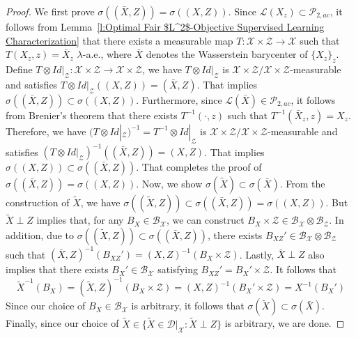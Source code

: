 \documentclass[twoside,11pt]{article}
\begin{document}
\begin{proof}
We first prove $\sigma((\bar{X},Z)) = \sigma((X,Z))$. Since $\mathcal{L}(X_z) \subset \mathcal{P}_{2,ac}$, it follows from Lemma~\ref{l:Optimal Fair $L^2$-Objective Supervised Learning Characterization} that there exists a measurable map $T: \mathcal{X} \times \mathcal{Z} \rightarrow \mathcal{X}$ such that $T(X_z,z) = \bar{X}_z$ $\lambda$-a.e., where $\bar{X}$ denotes the Wasserstein barycenter of $\{X_z\}_z$. Define $T \otimes Id|_{\mathcal{Z}} : \mathcal{X} \times \mathcal{Z} \rightarrow \mathcal{X} \times \mathcal{Z}$, we have $T \otimes Id|_{\mathcal{Z}}$ is $\mathcal{X} \times \mathcal{Z}/\mathcal{X} \times \mathcal{Z}$-measurable and satisfies $T \otimes Id|_{\mathcal{Z}}((X,Z)) = (\bar{X},Z)$. That implies $\sigma((\bar{X},Z)) \subset \sigma((X,Z))$. Furthermore, since $\mathcal{L}(\bar{X}) \in \mathcal{P}_{2,ac}$, it follows from Brenier's theorem \cite{brenier1991polar} that there exists $T^{-1}(\cdot,z)$ such that $T^{-1}(\bar{X}_z,z) = X_z$. Therefore, we have $(T \otimes Id|_{\mathcal{Z}})^{-1} = T^{-1} \otimes Id|_{\mathcal{Z}}$ is $\mathcal{X} \times \mathcal{Z}/\mathcal{X} \times \mathcal{Z}$-measurable and satisfies $(T \otimes Id|_{\mathcal{Z}})^{-1}((\bar{X},Z)) = (X,Z)$.  That implies $\sigma((X,Z))  \subset \sigma((\bar{X},Z))$. That completes the proof of $\sigma((\bar{X},Z)) = \sigma((X,Z))$.
Now, we show $\sigma(\tilde{X}) \subset \sigma(\bar{X})$. From the construction of $\tilde{X}$, we have $\sigma((\tilde{X},Z)) \subset \sigma((\bar{X},Z)) = \sigma((X,Z))$.  But $\tilde{X} \perp Z$ implies that, for any $B_X \in \mathcal{B}_{\mathcal{X}}$, we can construct $B_X \times \mathcal{Z} \in \mathcal{B}_{\mathcal{X}} \otimes \mathcal{B}_{\mathcal{Z}}$. In addition, due to $\sigma((\tilde{X},Z)) \subset \sigma((\bar{X},Z))$, there exists $B_{XZ}' \in \mathcal{B}_{\mathcal{X}} \otimes \mathcal{B}_{\mathcal{Z}}$ such that $(\bar{X},Z)^{-1}(B_{XZ}') = (X,Z)^{-1}(B_X \times \mathcal{Z})$. Lastly, $\bar{X} \perp Z$ also implies that there exists $B_X' \in \mathcal{B}_{\mathcal{X}}$ satisfying $B_{XZ}' = B_X' \times \mathcal{Z}$. It follows that
\begin{equation}
\tilde{X}^{-1}(B_X) = (\tilde{X},Z)^{-1}(B_X \times \mathcal{Z}) = (X,Z)^{-1}(B_X' \times \mathcal{Z}) = X^{-1}(B_X')
\end{equation}
Since our choice of $B_X \in \mathcal{B}_{\mathcal{X}}$ is arbitrary, it follows that $\sigma(\tilde{X}) \subset \sigma(\bar{X})$. Finally, since our choice of $\tilde{X} \in \{\tilde{X} \in \mathcal{D}|_{\mathcal{X}} : \tilde{X} \perp Z \}$ is arbitrary, we are done.
\end{proof}
\end{document}
